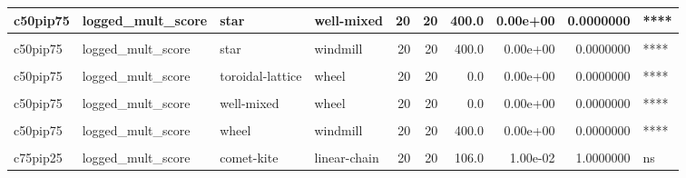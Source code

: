 \documentclass[
]{book}
\begin{document}
\begin{table}
\begin{tabular}{l|l|l|l|r|r|r|r|r|l}
\hline
c50pip75 & logged\_mult\_score & star & well-mixed & 20 & 20 & 400.0 & 0.00e+00 & 0.0000000 & ****\\
\hline
\cellcolor{gray!6}{c50pip75} & \cellcolor{gray!6}{logged\_mult\_score} & \cellcolor{gray!6}{star} & \cellcolor{gray!6}{wheel} & \cellcolor{gray!6}{20} & \cellcolor{gray!6}{20} & \cellcolor{gray!6}{186.0} & \cellcolor{gray!6}{7.18e-01} & \cellcolor{gray!6}{1.0000000} & \cellcolor{gray!6}{ns}\\
\hline
c50pip75 & logged\_mult\_score & star & windmill & 20 & 20 & 400.0 & 0.00e+00 & 0.0000000 & ****\\
\hline
\cellcolor{gray!6}{c50pip75} & \cellcolor{gray!6}{logged\_mult\_score} & \cellcolor{gray!6}{toroidal-lattice} & \cellcolor{gray!6}{well-mixed} & \cellcolor{gray!6}{20} & \cellcolor{gray!6}{20} & \cellcolor{gray!6}{386.0} & \cellcolor{gray!6}{0.00e+00} & \cellcolor{gray!6}{0.0000019} & \cellcolor{gray!6}{****}\\
\hline
c50pip75 & logged\_mult\_score & toroidal-lattice & wheel & 20 & 20 & 0.0 & 0.00e+00 & 0.0000000 & ****\\
\hline
\cellcolor{gray!6}{c50pip75} & \cellcolor{gray!6}{logged\_mult\_score} & \cellcolor{gray!6}{toroidal-lattice} & \cellcolor{gray!6}{windmill} & \cellcolor{gray!6}{20} & \cellcolor{gray!6}{20} & \cellcolor{gray!6}{360.0} & \cellcolor{gray!6}{2.90e-06} & \cellcolor{gray!6}{0.0005530} & \cellcolor{gray!6}{***}\\
\hline
c50pip75 & logged\_mult\_score & well-mixed & wheel & 20 & 20 & 0.0 & 0.00e+00 & 0.0000000 & ****\\
\hline
\cellcolor{gray!6}{c50pip75} & \cellcolor{gray!6}{logged\_mult\_score} & \cellcolor{gray!6}{well-mixed} & \cellcolor{gray!6}{windmill} & \cellcolor{gray!6}{20} & \cellcolor{gray!6}{20} & \cellcolor{gray!6}{137.0} & \cellcolor{gray!6}{9.10e-02} & \cellcolor{gray!6}{1.0000000} & \cellcolor{gray!6}{ns}\\
\hline
c50pip75 & logged\_mult\_score & wheel & windmill & 20 & 20 & 400.0 & 0.00e+00 & 0.0000000 & ****\\
\hline
\cellcolor{gray!6}{c75pip25} & \cellcolor{gray!6}{logged\_mult\_score} & \cellcolor{gray!6}{comet-kite} & \cellcolor{gray!6}{cycle} & \cellcolor{gray!6}{20} & \cellcolor{gray!6}{20} & \cellcolor{gray!6}{109.0} & \cellcolor{gray!6}{1.30e-02} & \cellcolor{gray!6}{1.0000000} & \cellcolor{gray!6}{ns}\\
\hline
c75pip25 & logged\_mult\_score & comet-kite & linear-chain & 20 & 20 & 106.0 & 1.00e-02 & 1.0000000 & ns\\

\end{tabular}
\end{table}
\end{document}
